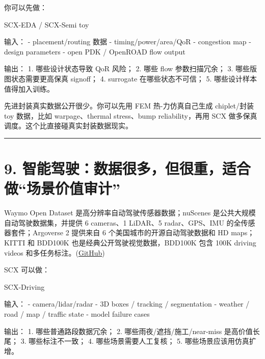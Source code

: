 \documentclass[
  12pt,
]{ctexart}
\newenvironment{Shaded}{}{}
\newcommand{\NormalTok}[1]{#1}
\begin{document}
你可以先做：

\begin{Shaded}
\begin{Highlighting}[]
\NormalTok{SCX{-}EDA / SCX{-}Semi toy}

\NormalTok{输入：}
\NormalTok{{-} placement/routing 数据}
\NormalTok{{-} timing/power/area/QoR}
\NormalTok{{-} congestion map}
\NormalTok{{-} design parameters}
\NormalTok{{-} open PDK / OpenROAD flow output}

\NormalTok{输出：}
\NormalTok{1. 哪些设计状态导致 QoR 风险；}
\NormalTok{2. 哪些 flow 参数扫描冗余；}
\NormalTok{3. 哪些版图状态需要更高保真 signoff；}
\NormalTok{4. surrogate 在哪些状态不可信；}
\NormalTok{5. 哪些设计样本值得加入训练。}
\end{Highlighting}
\end{Shaded}

先进封装真实数据公开很少。你可以先用 FEM 热-力仿真自己生成 chiplet/封装
toy 数据，比如 warpage、thermal stress、bump reliability，再用 SCX
做多保真调度。这个比直接碰真实封装数据现实。

\begin{center}\rule{0.5\linewidth}{0.5pt}\end{center}

\section{9.
智能驾驶：数据很多，但很重，适合做``场景价值审计''}\label{ux667aux80fdux9a7eux9a76ux6570ux636eux5f88ux591aux4f46ux5f88ux91cdux9002ux5408ux505aux573aux666fux4ef7ux503cux5ba1ux8ba1}

Waymo Open Dataset 是高分辨率自动驾驶传感器数据；nuScenes
是公共大规模自动驾驶数据集，并提供 6 cameras、1 LiDAR、5 radar、GPS、IMU
的全传感器套件；Argoverse 2 提供来自 6 个美国城市的开源自动驾驶数据和 HD
maps；KITTI 和 BDD100K 也是经典公开驾驶视觉数据，BDD100K 包含 100K
driving videos
和多任务标注。(\href{https://github.com/waymo-research/waymo-open-dataset?utm_source=chatgpt.com}{GitHub})

SCX 可以做：

\begin{Shaded}
\begin{Highlighting}[]
\NormalTok{SCX{-}Driving}

\NormalTok{输入：}
\NormalTok{{-} camera/lidar/radar}
\NormalTok{{-} 3D boxes / tracking / segmentation}
\NormalTok{{-} weather / road / map / traffic state}
\NormalTok{{-} model failure cases}

\NormalTok{输出：}
\NormalTok{1. 哪些普通路段数据冗余；}
\NormalTok{2. 哪些雨夜/遮挡/施工/near{-}miss 是高价值长尾；}
\NormalTok{3. 哪些标注不一致；}
\NormalTok{4. 哪些场景需要人工复核；}
\NormalTok{5. 哪些场景应该用仿真扩增。}
\end{Highlighting}
\end{Shaded}
\end{document}
